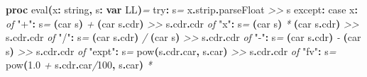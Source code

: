 \documentclass[
  12pt,
]{book}
\newenvironment{Shaded}{}{}
\newcommand{\CommentTok}[1]{\textcolor[rgb]{0.38,0.63,0.69}{\textit{#1}}}
\newcommand{\DataTypeTok}[1]{\textcolor[rgb]{0.56,0.13,0.00}{#1}}
\newcommand{\DecValTok}[1]{\textcolor[rgb]{0.25,0.63,0.44}{#1}}
\newcommand{\FloatTok}[1]{\textcolor[rgb]{0.25,0.63,0.44}{#1}}
\newcommand{\KeywordTok}[1]{\textcolor[rgb]{0.00,0.44,0.13}{\textbf{#1}}}
\newcommand{\NormalTok}[1]{#1}
\newcommand{\StringTok}[1]{\textcolor[rgb]{0.25,0.44,0.63}{#1}}
\begin{document}
\begin{Shaded}
\begin{Highlighting}[]
\KeywordTok{proc }\StringTok{eval}\KeywordTok{(}\NormalTok{x}\KeywordTok{:} \DataTypeTok{string}\KeywordTok{,}\NormalTok{ s}\KeywordTok{:} \KeywordTok{var} \DataTypeTok{LL}\KeywordTok{)}\CommentTok{=}
  \DataTypeTok{try}\KeywordTok{:}\NormalTok{ s}\CommentTok{=}\NormalTok{ x}\KeywordTok{.}\DataTypeTok{strip}\KeywordTok{.}\DataTypeTok{parseFloat} \CommentTok{\textgreater{}\textgreater{}}\NormalTok{ s}
  \DataTypeTok{except}\KeywordTok{:}
    \DataTypeTok{case}\NormalTok{  x}\KeywordTok{:}
      \CommentTok{of} \StringTok{"+"}\KeywordTok{:}\NormalTok{ s}\CommentTok{=} \KeywordTok{(}\DataTypeTok{car}\NormalTok{ s}\KeywordTok{)} \CommentTok{+} \KeywordTok{(}\DataTypeTok{car}\NormalTok{ s}\KeywordTok{.}\DataTypeTok{cdr}\KeywordTok{)} \CommentTok{\textgreater{}\textgreater{}}\NormalTok{ s}\KeywordTok{.}\DataTypeTok{cdr}\KeywordTok{.}\DataTypeTok{cdr}
      \CommentTok{of} \StringTok{"x"}\KeywordTok{:}\NormalTok{ s}\CommentTok{=} \KeywordTok{(}\DataTypeTok{car}\NormalTok{ s}\KeywordTok{)} \CommentTok{*} \KeywordTok{(}\DataTypeTok{car}\NormalTok{ s}\KeywordTok{.}\DataTypeTok{cdr}\KeywordTok{)} \CommentTok{\textgreater{}\textgreater{}}\NormalTok{ s}\KeywordTok{.}\DataTypeTok{cdr}\KeywordTok{.}\DataTypeTok{cdr}
      \CommentTok{of} \StringTok{"/"}\KeywordTok{:}\NormalTok{ s}\CommentTok{=} \KeywordTok{(}\DataTypeTok{car}\NormalTok{ s}\KeywordTok{.}\DataTypeTok{cdr}\KeywordTok{)} \CommentTok{/} \KeywordTok{(}\DataTypeTok{car}\NormalTok{ s}\KeywordTok{)} \CommentTok{\textgreater{}\textgreater{}}\NormalTok{ s}\KeywordTok{.}\DataTypeTok{cdr}\KeywordTok{.}\DataTypeTok{cdr}
      \CommentTok{of} \StringTok{"{-}"}\KeywordTok{:}\NormalTok{ s}\CommentTok{=} \KeywordTok{(}\DataTypeTok{car}\NormalTok{ s}\KeywordTok{.}\DataTypeTok{cdr}\KeywordTok{)} \CommentTok{{-}} \KeywordTok{(}\DataTypeTok{car}\NormalTok{ s}\KeywordTok{)} \CommentTok{\textgreater{}\textgreater{}}\NormalTok{ s}\KeywordTok{.}\DataTypeTok{cdr}\KeywordTok{.}\DataTypeTok{cdr}
      \CommentTok{of} \StringTok{"expt"}\KeywordTok{:}\NormalTok{ s}\CommentTok{=} \DataTypeTok{pow}\KeywordTok{(}\NormalTok{s}\KeywordTok{.}\DataTypeTok{cdr}\KeywordTok{.}\DataTypeTok{car}\KeywordTok{,}\NormalTok{ s}\KeywordTok{.}\DataTypeTok{car}\KeywordTok{)}  \CommentTok{\textgreater{}\textgreater{}}\NormalTok{ s}\KeywordTok{.}\DataTypeTok{cdr}\KeywordTok{.}\DataTypeTok{cdr}
      \CommentTok{of} \StringTok{"fv"}\KeywordTok{:}\NormalTok{ s}\CommentTok{=} \DataTypeTok{pow}\KeywordTok{(}\DecValTok{1}\FloatTok{.}\DecValTok{0} \CommentTok{+}\NormalTok{ s}\KeywordTok{.}\DataTypeTok{cdr}\KeywordTok{.}\DataTypeTok{car}\CommentTok{/}\DecValTok{100}\KeywordTok{,}\NormalTok{ s}\KeywordTok{.}\DataTypeTok{car}\KeywordTok{)} \CommentTok{*}

\end{Highlighting}
\end{Shaded}
\end{document}

